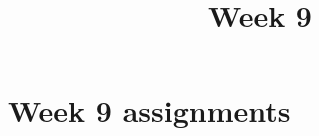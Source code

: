 \documentclass{xourse}
\title{Week 9}
\begin{document}
\begin{abstract}
\end{abstract}
\maketitle

\part{Week 9 assignments}

\end{document}
